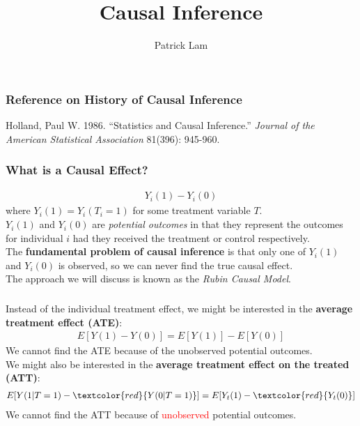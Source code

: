 \documentclass[handout]{beamer}
\author{Patrick Lam}
\title{Causal Inference}
\date{}
\begin{document}
\newcommand{\red}{\textcolor{red}}
\newcommand{\blue}{\textcolor{blue}}
\newcommand{\purple}{\textcolor{purple}}

\frame{\titlepage}

\begin{frame}
\frametitle{Reference on History of Causal Inference}
Holland, Paul W. 1986.  ``Statistics and Causal Inference.''  {\it
Journal of the American Statistical Association} 81(396): 945-960. 
\end{frame}

\begin{frame}
\frametitle{What is a Causal Effect?}
\pause
\begin{eqnarray*}
Y_i(1) - Y_i(0)
\end{eqnarray*}
\pause
where $Y_i(1) = Y_i(T_i = 1)$ for some treatment variable $T$. \\
\bigskip
\bigskip
\pause
$Y_i(1)$ and $Y_i(0)$ are {\it potential outcomes} \pause in that they
represent the outcomes for individual $i$ had they received the
treatment or control respectively. \\
\bigskip
\pause
The {\bf fundamental problem of causal inference} is that only one of
$Y_i(1)$ and $Y_i(0)$ is observed, so we can never find the true
causal effect.\\
\pause
\bigskip
The approach we will discuss is known as the {\it Rubin Causal Model}.
\end{frame}

\begin{frame}
\frametitle{}
Instead of the individual treatment effect, we might be interested in
the {\bf average treatment effect (ATE)}: 
\pause
\begin{eqnarray*}
E[Y(1) - Y(0)] = E[Y(1)] - E[Y(0)]
\end{eqnarray*}
\pause
We cannot find the ATE because of the unobserved potential outcomes. \\
\pause
\bigskip
We might also be interested in the {\bf average treatment effect on
the treated (ATT)}:
\pause
\begin{eqnarray*}
E[Y(1|T=1) - \red{Y(0 | T=1)}] = E[Y_t(1) - \red{Y_t(0)}]
\end{eqnarray*}
\pause
We cannot find the ATT because of \red{unobserved} potential outcomes.
\end{frame}
\end{document}
